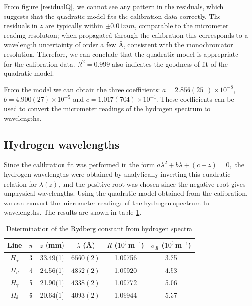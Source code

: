 \documentclass[12pt]{article}
\begin{document}
From figure \ref{residualQ}, we cannot see any pattern in the residuals, which suggests that the quadratic model fits the calibration data correctly. The residuals in $z$ are typically within $\pm 0.01 mm$, comparable to the micrometer reading resolution; when propagated through the calibration this corresponds to a wavelength uncertainty of order a few Å, consistent with the monochromator resolution. Therefore, we can conclude that the quadratic model is appropriate for the calibration data. $R^2 = 0.999$ also indicates the goodness of fit of the quadratic model.

From the model we can obtain the three coefficients: $a = 2.856(251) \times 10^{-8}$, $b = 4.900(27) \times 10^{-5}$ and $c = 1.017(704) \times 10^{-1}$. These coefficients can be used to convert the micrometer readings of the hydrogen spectrum to wavelengths.



\subsection{Hydrogen wavelengths}

Since the calibration fit was performed in the form 
\( a\lambda^2 + b\lambda + (c-z)=0,\)
the hydrogen wavelengths were obtained by analytically inverting this quadratic relation for $\lambda(z)$, and the positive root was chosen since the negative root gives unphysical wavelengths. Using the quadratic model obtained from the calibration, we can convert the micrometer readings of the hydrogen spectrum to wavelengths. The results are shown in table \ref{rydberg}.

\begin{table}[htbp]
\centering
\caption{Determination of the Rydberg constant from hydrogen spectra}
\begin{tabular}{c c c c c c}
\hline\hline
Line & $n$ & $z$ (mm) & $\lambda$ (\AA) 
& $R$ ($10^7$\,m$^{-1}$) 
& $\sigma_R$ ($10^3$\,m$^{-1}$) \\
\hline\hline
$H_\alpha$ & 3 & 33.49(1) & $6560(2)$ & 1.09756 & 3.35 \\
$H_\beta$  & 4 & 24.56(1) & $4852(2)$ & 1.09920 & 4.53 \\
$H_\gamma$ & 5 & 21.90(1) & $4338(2)$ & 1.09772 & 5.06 \\
$H_\delta$ & 6 & 20.64(1) & $4093(2)$ & 1.09944 & 5.37 \\
\hline\hline
\end{tabular}
\label{rydberg}
\end{table}
\end{document}
